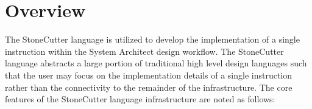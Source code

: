 \documentclass{article}
\begin{document}

\clearpage
\begin{versionhistory}
\end{versionhistory}
\clearpage

\clearpage
\section{Overview}

The StoneCutter language is utilized to develop the implementation of a 
single instruction within the System Architect design workflow.  The StoneCutter 
language abstracts a large portion of traditional high level design languages such 
that the user may focus on the implementation details of a single instruction rather 
than the connectivity to the remainder of the infrastructure.  The core features of 
the StoneCutter language infrastructure are noted as follows: 
\end{document}
